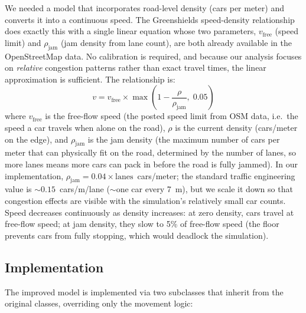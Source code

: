 \documentclass[12pt]{article}
\begin{document}
We needed a model that incorporates road-level density (cars per meter) and converts it into a continuous speed. The Greenshields speed-density relationship \citep{greenshields1935} does exactly this with a single linear equation whose two parameters, $v_{\text{free}}$ (speed limit) and $\rho_{\text{jam}}$ (jam density from lane count), are both already available in the OpenStreetMap data. No calibration is required, and because our analysis focuses on \textit{relative} congestion patterns rather than exact travel times, the linear approximation is sufficient. The relationship is:
\begin{equation}
    v = v_{\text{free}} \times \max\!\left(1 - \frac{\rho}{\rho_{\text{jam}}},\; 0.05\right)
    \label{eq:greenshields}
\end{equation}
where $v_{\text{free}}$ is the free-flow speed (the posted speed limit from OSM data, i.e.\ the speed a car travels when alone on the road), $\rho$ is the current density (cars/meter on the edge), and $\rho_{\text{jam}}$ is the jam density (the maximum number of cars per meter that can physically fit on the road, determined by the number of lanes, so more lanes means more cars can pack in before the road is fully jammed). In our implementation, $\rho_{\text{jam}} = 0.04 \times \text{lanes}$~cars/meter; the standard traffic engineering value is ${\sim}0.15$~cars/m/lane (${\sim}$one car every 7~m), but we scale it down so that congestion effects are visible with the simulation's relatively small car counts. Speed decreases continuously as density increases: at zero density, cars travel at free-flow speed; at jam density, they slow to 5\% of free-flow speed (the floor prevents cars from fully stopping, which would deadlock the simulation).

\subsection{Implementation}

The improved model is implemented via two subclasses that inherit from the original classes, overriding only the movement logic:
\end{document}
